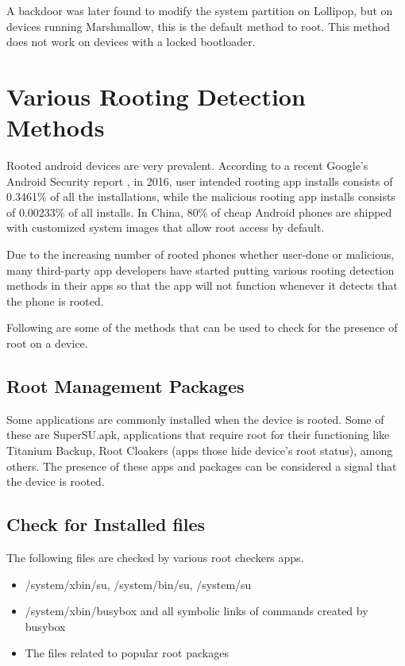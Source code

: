 A backdoor was later found to modify the system partition on Lollipop, but on devices running Marshmallow, this is the default method to root. This method does not work on devices with a locked bootloader.

\section{Various Rooting Detection Methods}
Rooted android devices are very prevalent. According to a recent Google's Android Security report \cite{GoogleAn32:online}, in 2016, user intended rooting app installs consists of 0.3461\% of all the installations, while the malicious rooting app installs consists of  0.00233\% of all installs. In China, 80\% of cheap Android phones are shipped with customized system images that allow root access by default.\cite{80ChinaS47:online}
    
Due to the increasing number of rooted phones whether user-done or malicious, many third-party app developers have started putting various rooting detection methods in their apps so that the app will not function whenever it detects that the phone is rooted.

Following are some of the methods that can be used to check for the presence of root on a device.

\subsection{Root Management Packages}
Some applications are commonly installed when the device is rooted. Some of these are SuperSU.apk, applications that require root for their functioning like Titanium Backup, Root Cloakers (apps those hide device's root status), among others. The presence of these apps and packages can be considered a signal that the device is rooted.    
    
\subsection{Check for Installed files}
    The following files are checked by various root checkers apps.
    \begin{itemize}
        \item /system/xbin/su, /system/bin/su, /system/su
        \item /system/xbin/busybox and all symbolic links of commands created by busybox
        \item The files related to popular root packages
    \end{itemize}
    

